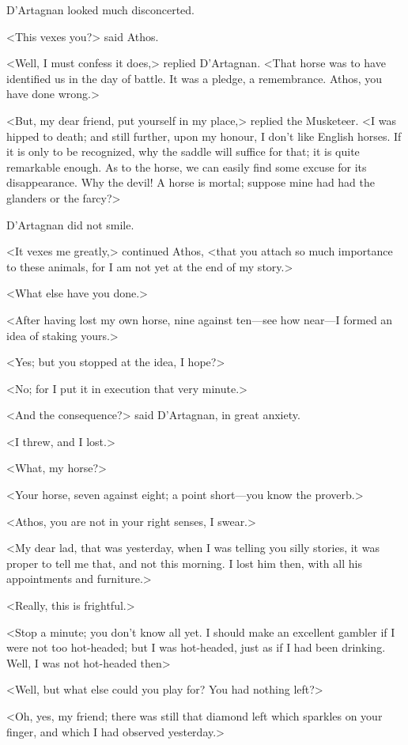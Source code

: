 D'Artagnan looked much disconcerted. 

<This vexes you?> said Athos. 

<Well, I must confess it does,> replied D'Artagnan. <That horse was to have identified us in the day of battle. It was a pledge, a remembrance. Athos, you have done wrong.> 

<But, my dear friend, put yourself in my place,> replied the Musketeer. <I was hipped to death; and still further, upon my honour, I don't like English horses. If it is only to be recognized, why the saddle will suffice for that; it is quite remarkable enough. As to the horse, we can easily find some excuse for its disappearance. Why the devil! A horse is mortal; suppose mine had had the glanders or the farcy?> 

D'Artagnan did not smile. 

<It vexes me greatly,> continued Athos, <that you attach so much importance to these animals, for I am not yet at the end of my story.> 

<What else have you done.> 

<After having lost my own horse, nine against ten—see how near—I formed an idea of staking yours.> 

<Yes; but you stopped at the idea, I hope?> 

<No; for I put it in execution that very minute.> 

<And the consequence?> said D'Artagnan, in great anxiety. 

<I threw, and I lost.> 

<What, my horse?> 

<Your horse, seven against eight; a point short—you know the proverb.> 

<Athos, you are not in your right senses, I swear.> 

<My dear lad, that was yesterday, when I was telling you silly stories, it was proper to tell me that, and not this morning. I lost him then, with all his appointments and furniture.> 

<Really, this is frightful.> 

<Stop a minute; you don't know all yet. I should make an excellent gambler if I were not too hot-headed; but I was hot-headed, just as if I had been drinking. Well, I was not hot-headed then\longdash> 

<Well, but what else could you play for? You had nothing left?> 

<Oh, yes, my friend; there was still that diamond left which sparkles on your finger, and which I had observed yesterday.> 

